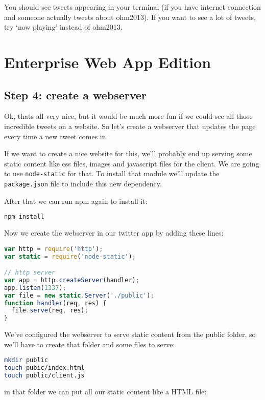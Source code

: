 \documentclass[a4paper]{report}
\begin{document}
\noindent You should see tweets appearing in your terminal (if you have internet connection and someone actually tweets about ohm2013). If you want to see a lot of tweets, try `now playing' instead of ohm2013.

\section*{Enterprise Web App Edition}

\subsection*{Step 4: create a webserver}
Ok, thats all very nice, but it would be much more fun if we could see all those incredible tweets on a website. So let's create a webserver that updates the page every time a new tweet comes in.

If we want to create a nice website for this, we'll probably end up serving some static content like css files, images and javascript files for the client. We are going to use \texttt{node-static} for that. To install that module we'll update the \texttt{package.json} file to include this new dependency.



After that we can run npm again to install it:
\begin{lstlisting}[language=bash]
npm install
\end{lstlisting}

\noindent Now we create the webserver in our twitter app by adding these lines:

\begin{lstlisting}[language=JavaScript]
var http = require('http');
var static = require('node-static');

// http server
var app = http.createServer(handler);
app.listen(1337);
var file = new static.Server('./public');
function handler(req, res) {
  file.serve(req, res);
}
\end{lstlisting}

\noindent We've configured the webserver to serve static content from the public folder, so we'll have to create that folder and some files to serve:
\begin{lstlisting}[language=bash]
mkdir public
touch pubic/index.html
touch public/client.js
\end{lstlisting}

\noindent in that folder we can put all our static content like a HTML file:
\end{document}
